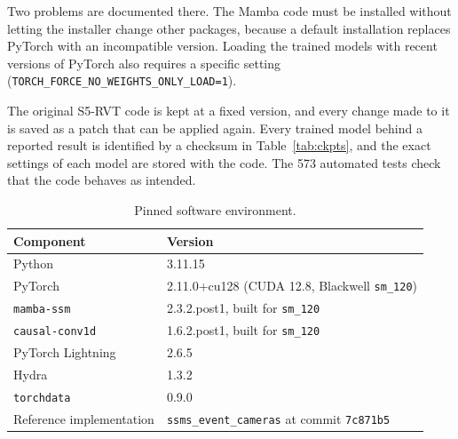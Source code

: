 \documentclass[11pt, a4paper]{report}
\begin{document}
Two problems are documented there. The Mamba code must be installed
without letting the installer change other packages, because a default installation replaces PyTorch with
an incompatible version. Loading the trained models with recent versions of PyTorch also requires a specific
setting (\texttt{TORCH\_FORCE\_NO\_WEIGHTS\_ONLY\_LOAD=1}).

The original S5-RVT code is kept at a fixed version, and every change made to it is saved as a patch that
can be applied again. Every trained model behind a reported result is identified by a checksum in
Table~\ref{tab:ckpts}, and the exact settings of each model are stored with the code. The 573 automated
tests check that the code behaves as intended.

\begin{table}[htbp]
\centering
\small
\caption[Software environment]{Pinned software environment.}
\label{tab:env}
\begin{tabular}{ll}
\toprule
Component & Version \\
\midrule
Python & 3.11.15 \\
PyTorch & 2.11.0+cu128 (CUDA 12.8, Blackwell \texttt{sm\_120}) \\
\texttt{mamba-ssm} & 2.3.2.post1, built for \texttt{sm\_120} \\
\texttt{causal-conv1d} & 1.6.2.post1, built for \texttt{sm\_120} \\
PyTorch Lightning & 2.6.5 \\
Hydra & 1.3.2 \\
\texttt{torchdata} & 0.9.0 \\
Reference implementation & \texttt{ssms\_event\_cameras} at commit \texttt{7c871b5} \\
\bottomrule
\end{tabular}
\end{table}
\end{document}
